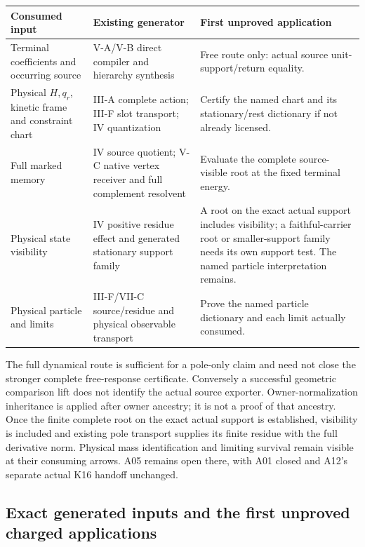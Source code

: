 \documentclass[12pt,a4paper]{article}
\begin{document}
\begin{center}
\begin{tabular}{p{}p{}p{}}
\textbf{Consumed input}&\textbf{Existing generator}&\textbf{First unproved application}\\\hline
Terminal coefficients and occurring source
&V-A/V-B direct compiler and hierarchy synthesis
&Free route only: actual source unit-support/return equality.\\
Physical $H,q_r$, kinetic frame and constraint chart
&III-A complete action; III-F slot transport; IV quantization
&Certify the named chart and its stationary/rest dictionary if not already licensed.\\
Full marked memory
&IV source quotient; V-C native vertex receiver and full complement resolvent
&Evaluate the complete source-visible root at the fixed terminal energy.\\
Physical state visibility
&IV positive residue effect and generated stationary support family
&A root on the exact actual support includes visibility; a faithful-carrier root or smaller-support family needs its own support test. The named particle interpretation remains.\\
Physical particle and limits
&III-F/VII-C source/residue and physical observable transport
&Prove the named particle dictionary and each limit actually consumed.
\end{tabular}
\end{center}

The full dynamical route is sufficient for a pole-only claim and need not
close the stronger complete free-response certificate. Conversely a
successful geometric comparison lift does not identify the actual source
exporter. Owner-normalization inheritance is applied after owner ancestry;
it is not a proof of that ancestry. Once the finite complete root on the exact actual support is
established, visibility is included and existing pole transport supplies its finite residue with the
full derivative norm. Physical mass identification and limiting survival
remain visible at their consuming arrows. A05 remains open there, with
A01 closed and A12's separate actual K16 handoff unchanged.





\subsection{Exact generated inputs and the first unproved charged applications}
\label{p2a:sec:v2169-charged-construction-reuse}
\end{document}
